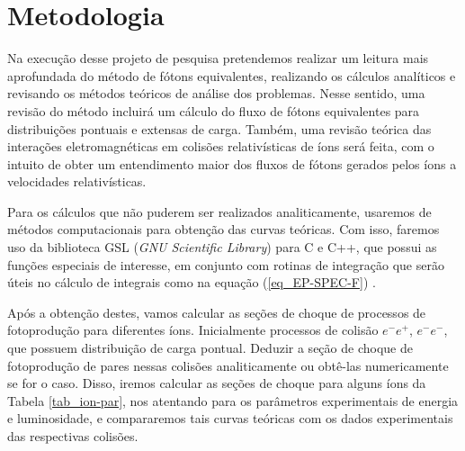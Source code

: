 \chapter{Metodologia}
Na execução desse projeto de pesquisa pretendemos realizar um leitura mais
aprofundada do método de fótons equivalentes, realizando os cálculos analíticos
e revisando os métodos teóricos de análise dos problemas. Nesse sentido, uma
revisão do método incluirá um cálculo do fluxo de fótons equivalentes para
distribuições pontuais e extensas de carga. Também, uma revisão teórica das
interações eletromagnéticas em colisões relativísticas de íons será feita, com
o intuito de obter um entendimento maior dos fluxos de fótons gerados pelos
íons a velocidades relativísticas.

Para os cálculos que não puderem ser realizados analiticamente, usaremos de
métodos computacionais para obtenção das curvas teóricas. Com isso, faremos uso
da biblioteca GSL (\textit{GNU Scientific Library}) para C e C++, que possui as
funções especiais de interesse, em conjunto com rotinas de integração que serão
úteis no cálculo de integrais como na equação (\ref{eq_EP-SPEC-F})
\cite{gsl_manual}.

Após a obtenção destes, vamos calcular as seções de choque de processos de
fotoprodução para diferentes íons.  Inicialmente processos de colisão $e^-
e^+$, $e^- e^-$, que possuem distribuição de carga pontual. Deduzir a seção de
choque de fotoprodução de pares nessas colisões analiticamente ou obtê-las
numericamente se for o caso. Disso, iremos calcular as seções de choque para
alguns íons da Tabela \ref{tab_ion-par}, nos atentando para os parâmetros
experimentais de energia e luminosidade, e compararemos tais curvas teóricas
com os dados experimentais das respectivas colisões.


